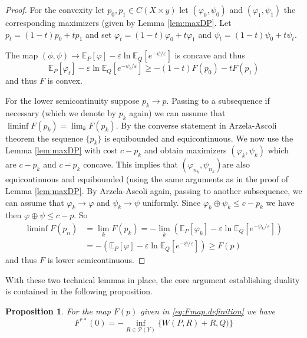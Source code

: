 \documentclass{amsart}
\newtheorem{proposition}[theorem]{Proposition}
\theoremstyle{definition}
\theoremstyle{remark}
\numberwithin{equation}{section}
\begin{document}
\begin{proof} For the convexity let  $p_0, p_1 \in C(X\times y)$ let $(\varphi_0, \psi_0)$ and $(\varphi_1, \psi_1)$ the corresponding maximizers (given by Lemma \ref{lem:maxDP}. Let $p_t = (1-t)p_0 + t p_1$ and  set $\varphi_t = (1-t) \varphi_0 + t \varphi_1$ 
and $\psi_t = (1-t) \psi_0 + t \psi_t$. 

The map $(\phi, \psi) \to \mathbb{E}_P[\varphi] - \varepsilon \ln \mathbb{E}_Q[e^{-\psi/\varepsilon}]$ is concave and thus 
\begin{equation}
\mathbb{E}_P[\varphi_t] - \varepsilon \ln \mathbb{E}_Q[e^{-\psi_t/\varepsilon}] \ge -(1-t) F(p_0) -t F(p_1)
\end{equation}
and thus $F$ is convex. 

For the lower semicontinuity suppose $p_k \to p$. Passing to a subsequence if necessary (which we denote by $p_k$ again) we can assume that $\liminf F(p_k)=\lim_{k} F(p_{k})$.  By the converse statement in Arzela-Ascoli theorem the sequence $\{p_{k}\}$ is equibounded and equicontinuous.   We now use the Lemma \ref{lem:maxDP} with cost $c-p_k$ and  obtain maximizers   $(\varphi_{k},\psi_{k})$ which are $c-p_{k}$ and $\overline{c-p_{k}}$ concave.  This implies that $(\varphi_{n_k},\psi_{n_k})$are also equicontinuous and equibounded (using the same arguments as in the proof of 
Lemma \ref{lem:maxDP}. 
By Arzela-Ascoli again, passing to another subsequence, we can assume that $\varphi_{k} \to \varphi$ and $\psi_{k}\to \psi$ uniformly. 
Since $\varphi_{k} \oplus\psi_{k}\le c-p_k$ we have then $\varphi \oplus \psi \le c-p$. So 
\begin{equation}
\begin{aligned}
\liminf F(p_n) &= \lim_{k} F(p_{k})  = - \lim_{k}  \left(\mathbb{E}_P[\varphi_{k}] - \varepsilon \ln \mathbb{E}_Q[e^{-\psi_{k}/\varepsilon}]\right) \\
&=  - \left(\mathbb{E}_P[\varphi] - \varepsilon \ln \mathbb{E}_Q[e^{-\psi/\varepsilon}]\right) \ge F(p)
\end{aligned}
\end{equation}
and thus $F$ is lower semicontinuous. 
\end{proof}

With these two technical lemmas in place, the core argument establishing duality is contained in the following proposition.

\begin{proposition}\label{prop:LTcomputation}
For the map $F(p)$ given in \eqref{eq:Fmap.definition} we have 
\begin{equation}
F^{**}(0) = - \inf_{R \in \mathcal{P}(Y)}\{ W(P,R) +\mathfrak{}R, Q)\}
\end{equation}
\end{proposition}
\end{document}
